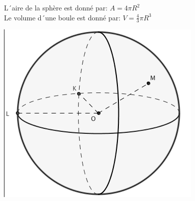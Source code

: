 
L´aire de la sphère est donné par: $A=4 \pi R^2$\\
Le volume d´une boule est donné par: $V=\frac{4}{3} \pi R^3$
\begin{center}
\includegraphics[scale=0.4]{RepS-Sphere.jpg} 
\end{center}